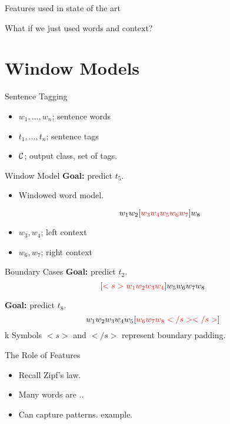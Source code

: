 \documentclass{beamer}
\begin{document}
\begin{frame}{Features used in state of the art}
  
\end{frame}




\begin{frame}{}
  What if we just used words and context? 
\end{frame}


\section{Window Models}

\begin{frame}{Sentence Tagging}
  \begin{itemize}
  \item $w_1, \ldots, w_n$; sentence words
  \item $t_1, \ldots, t_n$; sentence tags
  \item $\mathcal{C}$; output class, set of tags.  
  \end{itemize}  
\end{frame}


\begin{frame}{Window Model}
  \textbf{Goal:} predict $t_5$.

  
  \begin{itemize}
  \item Windowed word model. 
  
  \[ w_1 w_2 [\textcolor{red}{w_3 w_4 w_5 w_6 w_7}] w_8 \] 

  \item $w_3, w_4$; left context  
  \item $w_6, w_7$; right context  
  \end{itemize}
\end{frame}


\begin{frame}{Boundary Cases}
  \textbf{Goal:} predict $t_2$.
  \[ [\textcolor{red}{ <s> w_1 w_2 w_3 w_4}] w_5 w_6 w_7 w_8 \] 


  \textbf{Goal:} predict $t_8$.
  \[  w_1 w_2 w_3 w_4 w_5 [\textcolor{red}{w_6 w_7 w_8  </s> </s>}] \] 
k
  Symbols $<s>$ and $</s>$ represent boundary padding. 
\end{frame}


\begin{frame}{The Role of Features}
  \begin{itemize}
  \item Recall Zipf's law. 
  \item Many words are .. 
  \item Can capture patterns. 
    example.
  \end{itemize}
\end{frame}
\end{document}
